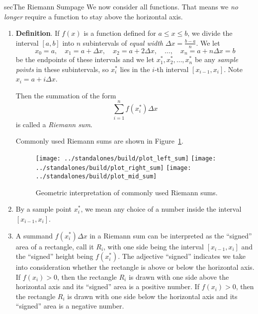 \documentclass[../main]{subfiles}
\begin{document}
%
%
\begin{outline}{sec}{The Riemann Sum}{page} \label{outline:riemann-sum}
  We now consider all functions. That means we \emph{no longer} require a function to stay above the horizontal axis.
  \begin{enumerate}
    \item \textbf{Definition}. If \(f(x)\) is a function defined for \(a \le x \le b\), we divide the interval \([a,b]\) into \(n\) subintervals of \emph{equal width} \(\Delta x = \frac{b-a}{n}\). We let
      \[
        x_{0} = a, \quad x_{1} = a + \Delta x, \quad x_{2} = a + 2 \Delta x, \quad \dots, \quad x_{n} = a + n \Delta x = b
      \]
      be the endpoints of these intervals and we let \(x_{1}^{*}, x_{2}^{*}, \dots, x_{n}^{*}\) be any \emph{sample points} in these subintervals, so \(x_{i}^{*}\) lies in the \(i\)-th interval \([x_{i-1}, x_{i}]\). Note \(x_{i} = a + i \Delta x\). 
      \begin{mdframed}[style=simple]
        Then the summation of the form
        \[
          \sum_{i=1}^{n} f(x_{i}^{*}) \Delta x
        \]
        is called a \emph{Riemann sum}.       
      \end{mdframed}


      Commonly used Riemann sums are shown in Figure~\ref{fig:riemann-sums}.
      \begin{figure}[h]  %
        \centering
        \texttt{[image: ../standalones/build/plot\_left\_sum]}
        \texttt{[image: ../standalones/build/plot\_right\_sum]}
        \texttt{[image: ../standalones/build/plot\_mid\_sum]}
        \caption{Geometric interpretation of commonly used Riemann sums.}
        \label{fig:riemann-sums}
      \end{figure}


    \item By a sample point \(x_{i}^{*}\), we mean any choice of a number inside the interval \([x_{i-1}, x_{i}]\). 

    \item A summand \(f(x_{i}^{*}) \Delta x\) in a Riemann sum can be interpreted as the ``signed'' area of a rectangle, call it \(R_{i}\), with one side being the interval \([x_{i-1}, x_{i}]\) and the ``signed'' height being \(f(x_{i}^{*})\). The adjective ``signed'' indicates we take into consideration whether the rectangle is above or below the horizontal axis. If \(f(x_{i}) > 0\), then the rectangle \(R_{i}\) is drawn with one side above the horizontal axis and its ``signed'' area is a positive number. If \(f(x_{i}) > 0\), then the rectangle \(R_{i}\) is drawn with one side below the horizontal axis and its ``signed'' area is a negative number.


\end{enumerate}
\end{outline}
\end{document}
